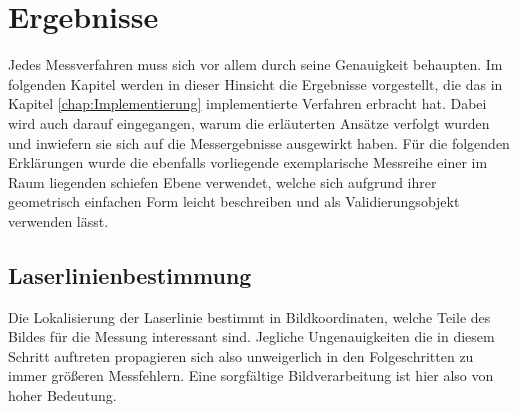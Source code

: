 \chapter{Ergebnisse}
Jedes Messverfahren muss sich vor allem durch seine Genauigkeit behaupten. Im folgenden Kapitel werden in dieser Hinsicht die Ergebnisse vorgestellt, die das in Kapitel \ref{chap:Implementierung} implementierte Verfahren erbracht hat. Dabei wird auch darauf eingegangen, warum die erläuterten Ansätze verfolgt wurden und inwiefern sie sich auf die Messergebnisse ausgewirkt haben. Für die folgenden Erklärungen wurde die ebenfalls vorliegende exemplarische Messreihe einer im Raum liegenden schiefen Ebene verwendet, welche sich aufgrund ihrer geometrisch einfachen Form leicht beschreiben und als Validierungsobjekt verwenden lässt.   

\section{Laserlinienbestimmung}
\label{subsec:segmentierung}
Die Lokalisierung der Laserlinie bestimmt in Bildkoordinaten, welche Teile des Bildes für die Messung interessant sind. Jegliche Ungenauigkeiten die in diesem Schritt auftreten propagieren sich also unweigerlich in den Folgeschritten zu immer größeren Messfehlern. Eine sorgfältige Bildverarbeitung ist hier also von hoher Bedeutung.\bigbreak
